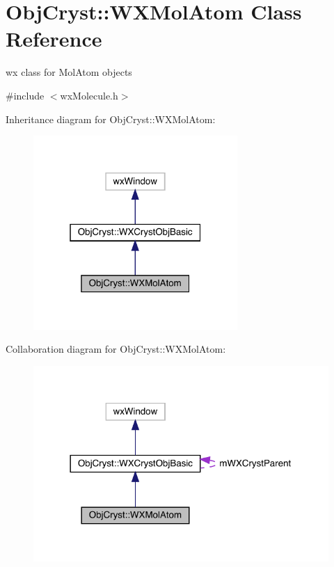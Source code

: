 \hypertarget{class_obj_cryst_1_1_w_x_mol_atom}{}\section{Obj\+Cryst\+::W\+X\+Mol\+Atom Class Reference}
\label{class_obj_cryst_1_1_w_x_mol_atom}


wx class for Mol\+Atom objects  




{\ttfamily \#include $<$wx\+Molecule.\+h$>$}



Inheritance diagram for Obj\+Cryst\+::W\+X\+Mol\+Atom\+:
\nopagebreak
\begin{figure}[H]
\begin{center}
\leavevmode
\includegraphics[width=220pt]{class_obj_cryst_1_1_w_x_mol_atom__inherit__graph}
\end{center}
\end{figure}


Collaboration diagram for Obj\+Cryst\+::W\+X\+Mol\+Atom\+:
\nopagebreak
\begin{figure}[H]
\begin{center}
\leavevmode
\includegraphics[width=318pt]{class_obj_cryst_1_1_w_x_mol_atom__coll__graph}
\end{center}
\end{figure}
